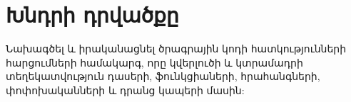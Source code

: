 {
	\section{Խնդրի դրվածքը}\label{sec:problemFormulation}
	Նախագծել և իրականացնել ծրագրային կոդի հատկությունների հարցումների համակարգ,
	որը կվերլուծի և կտրամադրի տեղեկատվություն դասերի, ֆունկցիաների,
	հրահանգների, փոփոխականների և դրանց կապերի մասին:
}